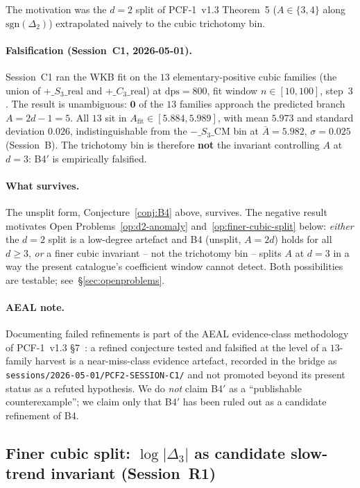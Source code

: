 \documentclass[11pt,a4paper]{article}
\theoremstyle{definition}
\theoremstyle{remark}
\begin{document}
The motivation was the $d=2$ split of PCF-1~v1.3 Theorem~5
($A\in\{3,4\}$ along $\mathrm{sgn}(\Delta_2)$) extrapolated naively to
the cubic trichotomy bin.

\paragraph{Falsification (Session~C1, 2026-05-01).}
Session~C1 ran the WKB fit on the $13$ elementary-positive cubic
families (the union of $+\_S_3\_\mathrm{real}$ and
$+\_C_3\_\mathrm{real}$) at $\mathrm{dps}=800$, fit window
$n\in[10,100]$, step~$3$. The result is unambiguous: $\mathbf{0}$ of
the $13$ families approach the predicted branch $A=2d-1=5$. All $13$
sit in $A_{\mathrm{fit}}\in[5.884, 5.989]$, with mean $5.973$ and
standard deviation $0.026$, indistinguishable from the
$-\_S_3\_\mathrm{CM}$ bin at $\bar{A}=5.982$, $\sigma=0.025$
(Session~B). The trichotomy bin is therefore \textbf{not} the
invariant controlling $A$ at $d=3$: B4$'$ is empirically falsified.

\paragraph{What survives.}
The unsplit form, Conjecture~\ref{conj:B4} above, survives. The
negative result motivates Open Problems~\ref{op:d2-anomaly}
and~\ref{op:finer-cubic-split} below: \emph{either} the $d=2$ split is
a low-degree artefact and B4 (unsplit, $A=2d$) holds for all $d\ge 3$,
\emph{or} a finer cubic invariant -- not the trichotomy bin -- splits
$A$ at $d=3$ in a way the present catalogue's coefficient window
cannot detect. Both possibilities are testable; see~\S\ref{sec:openproblems}.

\paragraph{AEAL note.}
Documenting failed refinements is part of the AEAL evidence-class
methodology of PCF-1~v1.3 \S 7~\cite{Papanokechi2026PCF1}: a refined
conjecture tested and falsified at the level of a $13$-family harvest
is a near-miss-class evidence artefact, recorded in the bridge as
\texttt{sessions/2026-05-01/PCF2-SESSION-C1/} and not promoted beyond
its present status as a refuted hypothesis. We do \emph{not} claim
B4$'$ as a ``publishable counterexample''; we claim only that
B4$'$ has been ruled out as a candidate refinement of B4.

\subsection{Finer cubic split: $\log|\Delta_3|$ as candidate
slow-trend invariant (Session~R1)}\label{sec:R1-finer-split}
\end{document}
